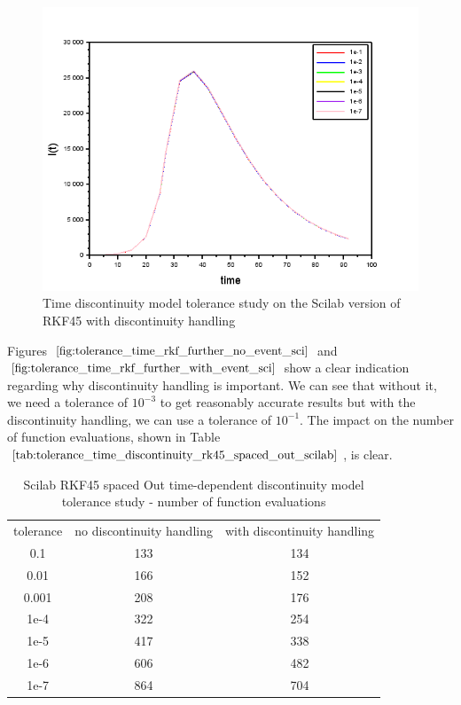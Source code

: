 \begin{figure}[H]
\centering
\includegraphics[width=0.7\linewidth]{./figures/tolerance_time_rkf_further_with_event_sci}
\caption{Time discontinuity model tolerance study on the Scilab version of RKF45 with discontinuity handling}
\label{fig:tolerance_time_rkf_further_with_event_sci}
\end{figure}

Figures $\ref{fig:tolerance_time_rkf_further_no_event_sci}$ and $\ref{fig:tolerance_time_rkf_further_with_event_sci}$ show a clear indication regarding why discontinuity handling is important. We can see that without it, we need a tolerance of $10^{-3}$ to get reasonably accurate results but with the discontinuity handling, we can use a tolerance of $10^{-1}$. The impact on the number of function evaluations, shown in Table $\ref{tab:tolerance_time_discontinuity_rk45_spaced_out_scilab}$, is clear.

\begin{table}[H]
\caption {Scilab RKF45 spaced Out time-dependent discontinuity model tolerance study - number of function evaluations} 
\label{tab:tolerance_time_discontinuity_rk45_spaced_out_scilab} 
\begin{center}
\begin{tabular}{ c c c }
tolerance & no discontinuity handling & with discontinuity handling\\ 
0.1 & 133 & 134 \\
0.01 & 166 & 152 \\
0.001 & 208 & 176 \\
1e-4 & 322 & 254 \\
1e-5 & 417 & 338 \\
1e-6 & 606 & 482 \\
1e-7 & 864 & 704 \\
\end{tabular}
\end{center}
\end{table}

